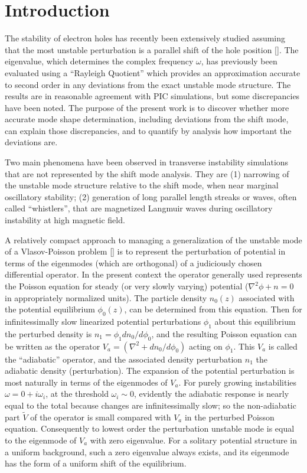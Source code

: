 \documentclass[12pt]{article}
\begin{document}
\section{Introduction}

The stability of electron holes has recently been extensively studied
assuming that the most unstable perturbation is a parallel shift of
the hole position []. The eigenvalue, which determines the complex
frequency $\omega$, has previously been evaluated using a ``Rayleigh
Quotient'' which provides an approximation accurate to second order in
any deviations from the exact unstable mode structure. The results are
in reasonable agreement with PIC simulations, but some discrepancies
have been noted. The purpose of the present work is to discover
whether more accurate mode shape determination, including deviations
from the shift mode, can explain those discrepancies, and to quantify
by analysis how important the deviations are.

Two main phenomena have been observed in transverse instability
simulations that are not represented by the shift mode analysis. They
are (1) narrowing of the unstable mode structure relative to the shift
mode, when near marginal oscillatory stability; (2) generation of long
parallel length streaks or waves, often called ``whistlers'', that are
magnetized Langmuir waves during oscillatory instability at high
magnetic field.

A relatively compact approach to managing a generalization of the
unstable mode of a Vlasov-Poisson problem [] is to represent the
perturbation of potential in terms of the eigenmodes (which are
orthogonal) of a judiciously chosen differential operator. In the
present context the operator generally used represents the Poisson
equation for steady (or very slowly varying) potential
($\nabla^2\phi+n=0$ in appropriately normalized units). The particle
density $n_0(z)$ associated with the potential equilibrium
$\phi_0(z)$, can be determined from this equation. Then for
infinitessimally slow linearized potential perturbations $\phi_1$
about this equilibrium the perturbed density is
$n_1=\phi_1dn_0/d\phi_0$, and the resulting Poisson equation can be
written as the operator $V_a =(\nabla^2+dn_0/d\phi_0)$ acting on
$\phi_1$. This $V_a$ is called the ``adiabatic'' operator, and the
associated density perturbation $n_1$ the adiabatic density
(perturbation). The expansion of the potential perturbation is most
naturally in terms of the eigenmodes of $V_a$. For purely growing
instabilities $\omega=0+i\omega_i$, at the threshold $\omega_i\sim 0$,
evidently the adiabatic response is nearly equal to the total because
changes are infinitessimally slow; so the non-adiabatic part
$\tilde V$ of the operator is small compared with $V_a$ in the
perturbed Poisson equation. Consequently to lowest order the
perturbation unstable mode is equal to the eigenmode of $V_a$ with
zero eigenvalue. For a solitary potential structure in a uniform
background, such a zero eigenvalue always exists, and its eigenmode
has the form of a uniform shift of the equilibrium.
\end{document}
